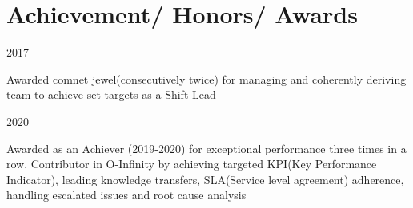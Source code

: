 \documentclass[letterpaper]{twentysecondcv} %
\begin{document}
        \section*{{\color{pblue}\LARGE  Achievement/ Honors/ Awards}}
        \vspace{-2mm}
        \begin{twentyshort}
        	\twentyitemshort
            	{2017}
                {\begin{itemize}
                    Awarded comnet jewel(consecutively twice) for managing and coherently deriving team to achieve set targets as a Shift Lead  
                  \end{itemize}
                }
        \end{twentyshort}
        
        \begin{twentyshort}
        	\twentyitemshort
            	{2020}
        	    {{
                  \begin{itemize}
                    Awarded as an Achiever (2019-2020) for exceptional performance three times in a row. Contributor in O-Infinity by achieving targeted KPI(Key Performance Indicator), leading knowledge transfers, SLA(Service level agreement) adherence, handling escalated issues and root cause analysis
                  \end{itemize}}}
        \end{twentyshort}
\end{document}
